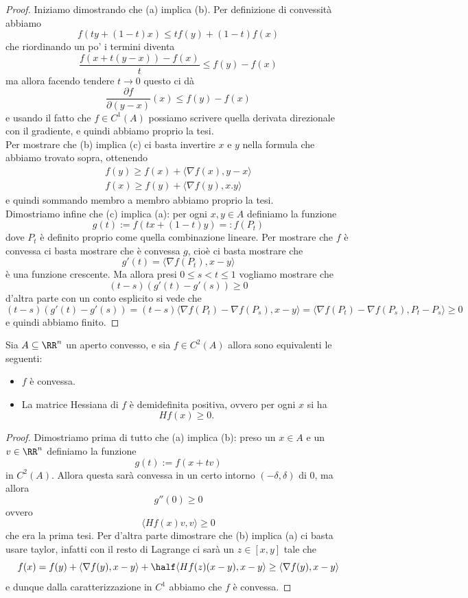 \documentclass[11pt]{scrartcl}
\begin{document}
	\begin{proof}
		Iniziamo dimostrando che (a) implica (b). Per definizione di convessità abbiamo
		$$f\left(ty+(1-t)x\right)\le tf(y)+(1-t)f(x)$$
		che riordinando un po' i termini diventa
		$$\frac{f\left(x+t(y-x)\right)-f(x)}{t}\le f(y)-f(x)$$
		ma allora facendo tendere $t\to 0$ questo ci dà
		$$\frac{\partial f}{\partial(y-x)}(x)\le f(y)-f(x)$$
		e usando il fatto che $f\in C^1(A)$ possiamo scrivere quella derivata direzionale con il gradiente, e quindi abbiamo proprio la tesi. \\
		Per mostrare che (b) implica (c) ci basta invertire $x$ e $y$ nella formula che abbiamo trovato sopra, ottenendo
		\begin{gather*}
			f(y)\ge f(x)+\langle \nabla f(x),y-x\rangle \\
			f(x)\ge f(y)+\langle \nabla f(y),x.y\rangle
		\end{gather*}
		e quindi sommando membro a membro abbiamo proprio la tesi. \\
		 Dimostriamo infine che (c) implica (a): per ogni $x,y\in A$ definiamo la funzione
		 $$g(t):=f(tx+(1-t)y)=:f(P_t)$$
		 dove $P_t$ è definito proprio come quella combinazione lineare. Per mostrare che $f$ è convessa ci basta mostrare che è convessa $g$, cioè ci basta mostrare che
		 $$g'(t)=\langle \nabla f(P_t),x-y\rangle$$
		 è una funzione crescente. Ma allora presi $0\le s < t \le 1$ vogliamo mostrare che 
		 $$(t-s)(g'(t)-g'(s))\ge 0$$
		 d'altra parte con un conto esplicito si vede che
		 $$(t-s)(g'(t)-g'(s))=(t-s)\langle \nabla f(P_t)-\nabla f(P_s),x-y\rangle=\langle \nabla f(P_t)-\nabla f(P_s),P_t-P_s\rangle \ge 0$$
		 e quindi abbiamo finito.
	\end{proof}
	\begin{theorem}
		Sia $A\subseteq\RR^n$ un aperto convesso, e sia $f\in C^2(A)$ allora sono equivalenti le seguenti:
		\begin{itemize}
			\item[(a)] $f$ è convessa.
			\item[(b)] La matrice Hessiana di $f$ è demidefinita positiva, ovvero per ogni $x$ si ha
			$$Hf(x)\ge 0.$$
		\end{itemize}
	\end{theorem}
	\begin{proof}
		Dimostriamo prima di tutto che (a) implica (b):
		preso un $x\in A$ e un $v\in \RR^n$ definiamo la funzione
		$$g(t):=f(x+tv)$$
		in $C^2(A)$. Allora questa sarà convessa in un certo intorno $(-\delta,\delta)$ di $0$, ma allora 
		$$g''(0)\ge 0$$
		ovvero
		$$\langle Hf(x)v,v\rangle \ge 0$$
		che era la prima tesi. Per d'altra parte dimostrare che (b) implica (a) ci basta usare taylor, infatti con il resto di Lagrange ci sarà un $z\in [x,y]$ tale che
		$$f(x)=f(y)+\langle \nabla f(y),x-y\rangle+\half \langle Hf(z)(x-y),x-y\rangle \ge \langle \nabla f(y),x-y\rangle $$
		e dunque dalla caratterizzazione in $C^1$ abbiamo che $f$ è convessa.
	\end{proof}
	
\end{document}
